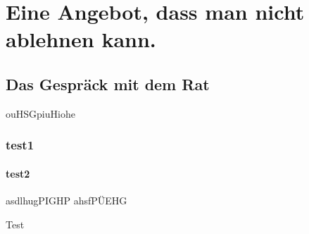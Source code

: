 \documentclass{include/pnp}
\begin{document}

	
	
	
	
	\TableOfContents
	

	\MainMatter

	\chapter[Im Ratshaus]{Eine Angebot, dass man nicht ablehnen kann.}
	\section{Das Gespräck mit dem Rat}
	ouHSGpiuHiohe
	\subsection{test1}
	\subsubsection{test2}
	asdlhugPIGHP
	\newpage
	ahsfPÜEHG
	\begin{fquote}
	Test
	\end{fquote}
\end{document}
